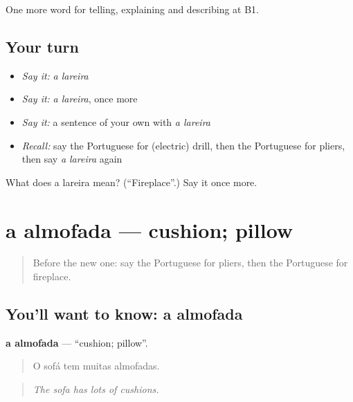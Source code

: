 \begin{grammarlens}[title={What you've built}]
One more word for telling, explaining and describing at B1.
\end{grammarlens}

\subsection*{Your turn}
\begin{itemize}
\raggedright
  \item \emph{Say it:} \emph{a lareira}
  \item \emph{Say it:} \emph{a lareira}, once more
  \item \emph{Say it:} a sentence of your own with \emph{a lareira}
  \item \emph{Recall:} say the Portuguese for (electric) drill, then the Portuguese for pliers, then say \emph{a lareira} again
\end{itemize}

\begin{tcolorbox}[breakable,colback=teal!4,colframe=teal!35!black,title={Before you move on}]
What does a lareira mean? (\textquotedblleft{}Fireplace\textquotedblright{}.) Say it once more.
\end{tcolorbox}
\section[a almofada]{a almofada — cushion; pillow}

\label{lesson:PT-C532-almofada}



\begin{quote}
Before the new one: say the Portuguese for pliers, then the Portuguese for fireplace.
\end{quote}

\subsection*{You'll want to know: a almofada}
\textbf{a almofada} — \textquotedblleft{}cushion; pillow\textquotedblright{}.

\begin{quote}
O sofá tem muitas almofadas.
\end{quote}

\begin{quote}
\emph{The sofa has lots of cushions.}
\end{quote}

